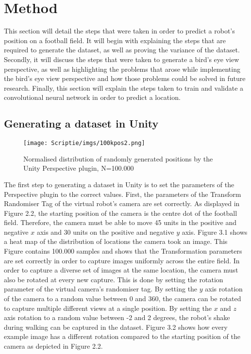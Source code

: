 \documentclass{uva-inf-bachelor-thesis}
\begin{document}

\chapter{Method}
    This section will detail the steps that were taken in order to predict a robot's position on a football field. It will begin with explaining the steps that are required to generate the dataset, as well as proving the variance of the dataset. Secondly, it will discuss the steps that were taken to generate a bird's eye view perspective, as well as highlighting the problems that arose while implementing the bird's eye view perspective and how those problems could be solved in future research. Finally, this section will explain the steps taken to train and validate a convolutional neural network in order to predict a location. 

    \section{Generating a dataset in Unity}
        \begin{figure}[H]
        \centering
        \texttt{[image: Scriptie/imgs/100kpos2.png]}
        \caption{Normalised distribution of randomly generated positions by the Unity Perspective plugin, N=100.000}
        \end{figure}
        
        The first step to generating a dataset in Unity is to set the parameters of the Perspective plugin to the correct values. First, the parameters of the Transform Randomiser Tag of the virtual robot's camera are set correctly. As displayed in Figure 2.2, the starting position of the camera is the centre dot of the football field. Therefore, the camera must be able to move 45 units in the positive and negative $x$ axis and 30 units on the positive and negative $y$ axis. 
        Figure 3.1 shows a heat map of the distribution of locations the camera took an image. This Figure contains 100.000 samples and shows that the Transformation parameters are set correctly in order to capture images uniformly across the entire field.
        In order to capture a diverse set of images at the same location, the camera must also be rotated at every new capture. This is done by setting the rotation parameter of the virtual camera's randomiser tag. By setting the $y$ axis rotation of the camera to a random value between 0 and 360, the camera can be rotated to capture multiple different views at a single position. By setting the $x$ and $z$ axis rotation to a random value between -2 and 2 degrees, the robot's shake during walking can be captured in the dataset. Figure 3.2 shows how every example image has a different rotation compared to the starting position of the camera as depicted in Figure 2.2.
\end{document}
